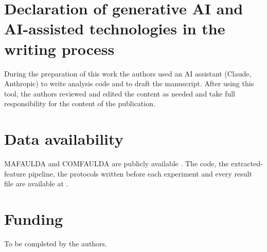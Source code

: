 \documentclass[preprint,review,12pt,authoryear=false]{elsarticle}
\begin{document}
\section*{Declaration of generative AI and AI-assisted technologies in the writing process}
During the preparation of this work the authors used an AI assistant (Claude, Anthropic) to write analysis code and to
draft the manuscript. After using this tool, the authors reviewed and edited the content as needed and take full
responsibility for the content of the publication.

\section*{Data availability}
MAFAULDA and COMFAULDA are publicly available \citep{mafaulda,comfaulda}. The code, the extracted-feature pipeline, the
protocols written before each experiment and every result file are available at \citep{pinneapple}.

\section*{Funding}
To be completed by the authors.



\end{document}
